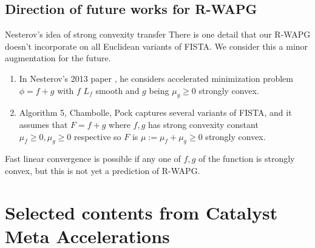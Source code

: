 \documentclass[11pt]{beamer}
\theoremstyle{definition}
\begin{document}
    \subsection{Direction of future works for R-WAPG}
        \begin{frame}{Nesterov's idea of strong convexity transfer}
            There is one detail that our R-WAPG doesn't incorporate on all Euclidean variants of FISTA. 
            We consider this a minor augmentation for the future. 
            \begin{enumerate}
                \item In Nesterov's 2013 paper \cite{nesterov_gradient_2013}, he considers accelerated  minimization problem $\phi = f + g$ with $f$ $L_f$ smooth and $g$ being $\mu_g \ge 0$ strongly convex. 
                \item Algorithm 5, Chambolle, Pock \cite{chambolle_introduction_2016} captures several variants of FISTA, and it assumes that $F = f + g$ where $f, g$ has strong convexity constant $\mu_f \ge 0, \mu_g \ge 0$ respective so $F$ is $\mu := \mu_f + \mu_g \ge 0$ strongly convex. 
            \end{enumerate}
            Fast linear convergence is possible if any one of $f, g$ of the function is strongly convex, but this is not yet a prediction of R-WAPG. 
        \end{frame}
        
\section{Selected contents from Catalyst Meta Accelerations}
\end{document}
